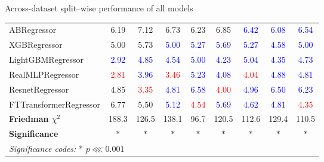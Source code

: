 \begin{frame}{Across-dataset split–wise performance of all models}
\begin{longtable}{lcccccccc}
    ABRegressor & 6.19 & 7.12 & 6.73 & 6.23 & 6.85 & \textcolor{blue}{6.42} & \textcolor{blue}{6.08} & \textcolor{blue}{6.54} \\

    XGBRegressor & 5.00 & 5.73 & \textcolor{blue}{5.00} & \textcolor{blue}{5.27} & \textcolor{blue}{5.69} & \textcolor{blue}{5.27} & \textcolor{blue}{4.58} & \textcolor{blue}{5.00} \\

    LightGBMRegressor & \textcolor{blue}{2.92} & \textcolor{blue}{4.85} & \textcolor{blue}{4.54} & \textcolor{blue}{5.00} & \textcolor{blue}{4.23} & \textcolor{blue}{5.04} & \textcolor{blue}{4.35} & \textcolor{blue}{4.73} \\

    RealMLPRegressor & \textcolor{red}{2.81} & \textcolor{blue}{3.96} & \textcolor{red}{3.46} & \textcolor{blue}{5.23} & \textcolor{blue}{4.08} & \textcolor{red}{4.04} & \textcolor{blue}{4.88} & \textcolor{blue}{4.81} \\

    ResnetRegressor & 4.85 & \textcolor{red}{3.35} & \textcolor{blue}{4.81} & \textcolor{blue}{6.58} & \textcolor{red}{4.00} & \textcolor{blue}{4.96} & \textcolor{blue}{6.50} & \textcolor{blue}{6.23} \\

    FTTransformerRegressor & 6.77 & 5.50 & \textcolor{blue}{5.12} & \textcolor{red}{4.54} & \textcolor{blue}{5.69} & \textcolor{blue}{4.62} & \textcolor{blue}{4.81} & \textcolor{red}{4.35} \\

    \addlinespace
    \midrule
    \textbf{Friedman $\chi^2$} &
    188.3 & 126.5 & 138.1 & 96.7 & 120.5 & 112.6 & 129.4 & 110.5 \\

    \textbf{Significance} &
    $\ast$ & $\ast$ & $\ast$ & $\ast$ &
    $\ast$ & $\ast$ & $\ast$ & $\ast$ \\

    \multicolumn{9}{l}{\footnotesize
    \tiny \textit{Significance codes:} * $p \lll  0.001$}
    \\

    \end{longtable}
\end{frame}
